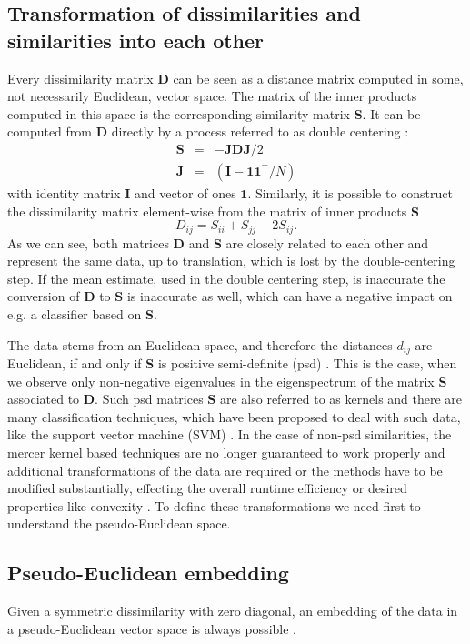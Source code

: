 \documentclass[twoside,11pt]{article}
\begin{document}
\subsection{Transformation of dissimilarities and similarities into each other}
Every dissimilarity matrix $\mathbf{D}$ can be seen as a distance matrix
computed in some, not necessarily Euclidean, vector space.
The matrix of the inner products computed in this space
is the corresponding similarity matrix $\mathbf{S}$.
It can be computed from $\mathbf{D}$ directly
by a process referred to as double centering \cite{Pekalska2005a}:
\begin{eqnarray*}
	\mathbf{S} &=& -\mathbf{J} \mathbf{D} \mathbf{J}/2 \\
	\mathbf{J} &=& (\mathbf{I}-\mathbf{1}\mathbf{1}^\top/N)
\end{eqnarray*}
with identity matrix $\mathbf{I}$  and vector of ones $\mathbf{1}$.
Similarly, it is possible to construct the dissimilarity matrix element-wise
from the matrix of inner products $\mathbf{S}$
\[D_{ij} = S_{ii} + S_{jj} - 2 S_{ij}.\]
As we can see, both matrices $\mathbf{D}$ and $\mathbf{S}$
are closely related to each other and represent the same data,
up to translation, which is lost by the double-centering step. 
If the mean estimate, used in the double centering step, is inaccurate
the conversion of $\mathbf{D}$ to $\mathbf{S}$ is inaccurate as well, which
can have a negative impact on e.g. a classifier based on $\mathbf{S}$.

The data stems from an Euclidean space,
and therefore the distances $d_{ij}$ are Euclidean,
if and only if $\mathbf{S}$ is positive semi-definite (psd) \cite{Berg1984}.
This is the case, when we observe only non-negative eigenvalues
in the eigenspectrum of the matrix $\mathbf{S}$ associated to $\mathbf{D}$.
Such psd matrices $\mathbf{S}$ are also referred to as kernels
and there are many classification techniques,
which have been proposed to deal with such data,
like the support vector machine (SVM) \cite{vapnik2000nature}. 
In the case of non-psd similarities, the mercer kernel based techniques
are no longer guaranteed to work properly
and additional transformations of the data are required
or the methods have to be modified substantially, 
effecting the overall runtime efficiency or desired properties like convexity \cite{Ong2004639,Haasdonk2005482}.
To define these transformations we need first
to understand the pseudo-Euclidean space.

\subsection{Pseudo-Euclidean embedding}\label{sec:pseudo_eucl_embedd}
Given a symmetric dissimilarity with zero diagonal,
an embedding of the data in a pseudo-Euclidean vector space
is always possible \cite{Goldfarb1984575}.
\end{document}
